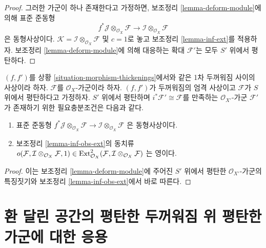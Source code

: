 \begin{proof}
그러한 가군이 하나 존재한다고 가정하면, 보조정리
\ref{lemma-deform-module}에 의해 표준 준동형
$$
f^*\mathcal{J} \otimes_{\mathcal{O}_X} \mathcal{F} \to
\mathcal{I} \otimes_{\mathcal{O}_X} \mathcal{F}
$$
은 동형사상이다. $\mathcal{K} =
\mathcal{I} \otimes_{\mathcal{O}_X} \mathcal{F}$ 및 $c = 1$로 놓고
보조정리 \ref{lemma-inf-ext}를 적용하자. 보조정리
\ref{lemma-deform-module}에 의해 대응하는 확대 $\mathcal{F}'$는 모두
$S'$ 위에서 평탄하다.
\end{proof}

\begin{lemma}
\label{lemma-inf-obs-ext-rel}
$(f, f')$를 상황 \ref{situation-morphism-thickenings}에서와 같은
1차 두꺼워짐 사이의 사상이라 하자. $\mathcal{F}$를
$\mathcal{O}_X$-가군이라 하자. $(f, f')$가 두꺼워짐의 엄격 사상이고
$\mathcal{F}$가 $S$ 위에서 평탄하다고 가정하자. $S'$ 위에서 평탄하며
$i^*\mathcal{F}' \cong \mathcal{F}$를 만족하는
$\mathcal{O}_{X'}$-가군 $\mathcal{F}'$가 존재하기 위한 필요충분조건은
다음과 같다.
\begin{enumerate}
\item 표준 준동형 $
f^*\mathcal{J} \otimes_{\mathcal{O}_X} \mathcal{F} \to
\mathcal{I} \otimes_{\mathcal{O}_X} \mathcal{F}$
은 동형사상이다.
\item 보조정리 \ref{lemma-inf-obs-ext}의 동치류
$o(\mathcal{F}, \mathcal{I} \otimes_{\mathcal{O}_X} \mathcal{F}, 1)
\in \mathop{\mathrm{Ext}}\nolimits^2_{\mathcal{O}_X}(
\mathcal{F}, \mathcal{I} \otimes_{\mathcal{O}_X} \mathcal{F})$
는 영이다.
\end{enumerate}
\end{lemma}

\begin{proof}
이는 보조정리 \ref{lemma-deform-module}에 주어진 $S'$ 위에서 평탄한
$\mathcal{O}_{X'}$-가군의 특징짓기와 보조정리
\ref{lemma-inf-obs-ext}에서 바로 따른다.
\end{proof}






\section{환 달린 공간의 평탄한 두꺼워짐 위 평탄한 가군에 대한 응용}
\label{section-flat}

